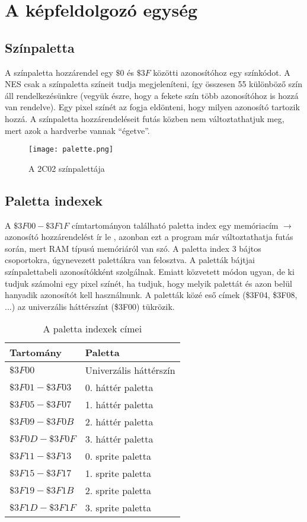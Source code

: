 \section{A képfeldolgozó egység}

\subsection{Színpaletta}

A színpaletta \cite{ppuref} hozzárendel egy $\$0$ és $\$3F$ közötti azonosítóhoz egy színkódot. A NES csak a színpaletta színeit tudja megjeleníteni, így összesen 55 különböző szín áll rendelkezésünkre (vegyük észre, hogy a fekete szín több azonosítóhoz is hozzá van rendelve). Egy pixel színét az fogja eldönteni, hogy milyen azonosító tartozik hozzá. A színpaletta hozzárendeléseit futás közben nem változtathatjuk meg, mert azok a hardverbe vannak ``égetve''.

\vspace{0.3cm}
\begin{figure}[H]
	\centering
	\texttt{[image: palette.png]}
	\caption{A 2C02 színpalettája}
\end{figure}

\subsection{Paletta indexek}

A $\$3F00 - \$3F1F$ címtartományon található paletta index egy memóriacím $\rightarrow$ azonosító hozzárendelést ír le \cite{ppuref}, azonban ezt a program már változtathatja futás során, mert RAM típusú memóriáról van szó. A paletta index 3 bájtos csoportokra, úgynevezett palettákra van felosztva. A paletták bájtjai színpalettabeli azonosítókként szolgálnak. Emiatt közvetett módon ugyan, de ki tudjuk számolni egy pixel színét, ha tudjuk, hogy melyik palettát és azon belül hanyadik azonosítót kell használnunk. A paletták közé eső címek (\$3F04, \$3F08, ...) az univerzális háttérszínt (\$3F00) tükrözik. 

\begin{table}[H]
	\centering
	\begin{tabular}{ | l | l | }
		\hline
		Tartomány & Paletta \\
		\hline			
		$ \$3F00 $ & Univerzális háttérszín \\
		$ \$3F01 - \$3F03 $ & 0. háttér paletta \\
		$ \$3F05 - \$3F07 $ & 1. háttér paletta \\
		$ \$3F09 - \$3F0B $ & 2. háttér paletta \\
		$ \$3F0D - \$3F0F $ & 3. háttér paletta \\
		$ \$3F11 - \$3F13 $ & 0. sprite paletta \\
		$ \$3F15 - \$3F17 $ & 1. sprite paletta \\
		$ \$3F19 - \$3F1B $ & 2. sprite paletta \\
		$ \$3F1D - \$3F1F $ & 3. sprite paletta \\
		\hline
	\end{tabular}
	\caption{A paletta indexek címei}
	\label{fig:paletteram}
\end{table}

